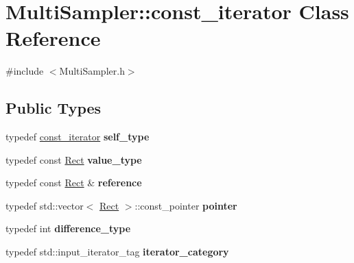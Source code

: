 \hypertarget{classMultiSampler_1_1const__iterator}{}\section{Multi\+Sampler\+:\+:const\+\_\+iterator Class Reference}
\label{classMultiSampler_1_1const__iterator}


{\ttfamily \#include $<$Multi\+Sampler.\+h$>$}

\subsection*{Public Types}
\begin{DoxyCompactItemize}
\item 
\hypertarget{classMultiSampler_1_1const__iterator_a6e64a0ff7e5ee735d8c88a0d70ab2857}{}typedef \hyperlink{classMultiSampler_1_1const__iterator}{const\+\_\+iterator} {\bfseries self\+\_\+type}\label{classMultiSampler_1_1const__iterator_a6e64a0ff7e5ee735d8c88a0d70ab2857}

\item 
\hypertarget{classMultiSampler_1_1const__iterator_a061a7f72b735f641eac3373be5cff1e2}{}typedef const \hyperlink{classRect}{Rect} {\bfseries value\+\_\+type}\label{classMultiSampler_1_1const__iterator_a061a7f72b735f641eac3373be5cff1e2}

\item 
\hypertarget{classMultiSampler_1_1const__iterator_af29ff2e6562c89f361c005303a8b59a6}{}typedef const \hyperlink{classRect}{Rect} \& {\bfseries reference}\label{classMultiSampler_1_1const__iterator_af29ff2e6562c89f361c005303a8b59a6}

\item 
\hypertarget{classMultiSampler_1_1const__iterator_ae917012c8ae8fc0bb9038dcdca31a3ff}{}typedef std\+::vector$<$ \hyperlink{classRect}{Rect} $>$\+::const\+\_\+pointer {\bfseries pointer}\label{classMultiSampler_1_1const__iterator_ae917012c8ae8fc0bb9038dcdca31a3ff}

\item 
\hypertarget{classMultiSampler_1_1const__iterator_a6cd88cbb7da488729378360af404868b}{}typedef int {\bfseries difference\+\_\+type}\label{classMultiSampler_1_1const__iterator_a6cd88cbb7da488729378360af404868b}

\item 
\hypertarget{classMultiSampler_1_1const__iterator_a615d1a82ff9d2359fd94781e2c977f07}{}typedef std\+::input\+\_\+iterator\+\_\+tag {\bfseries iterator\+\_\+category}\label{classMultiSampler_1_1const__iterator_a615d1a82ff9d2359fd94781e2c977f07}

\end{DoxyCompactItemize}
